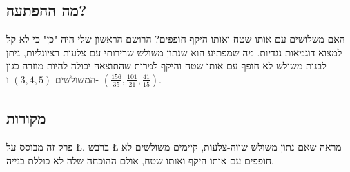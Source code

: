 \newpage

\subsection*{מה ההפתעה?}

האם משלושים עם אותו שטח ואותו היקף חופפים? הרושם הראשון שלי היה "כן" כי לא קל למצוא דוגמאות נגדיות. מה שמפתיע הוא שנתון משולש שרירותי עם צלעות רציונליות, ניתן לבנות משולש לא-חופף עם אותו שטח והיקף למרות שהתוצאה יכולה להיות מוזרה כגון המשולשים
$(3,4,5)$
ו-%
$\left(\frac{156}{35}, \frac{101}{21}, \frac{41}{15}\right)$.


\subsection*{מקורות}

פרק זה מבוסס על 
\L{\cite{mccallum}}.
ברבש
\L{\cite{marita}}
מראה שאם נתון משולש שווה-צלעות, קיימים משולשים לא חופפים עם אותו היקף ואותו שטח, אולם ההוכחה שלה לא כוללת בנייה. 
